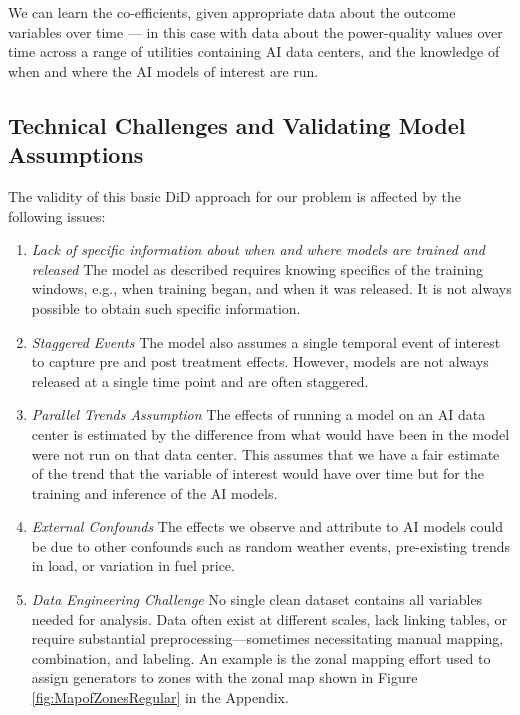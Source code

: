 \documentclass[sigconf,authordraft]{acmart}
\newcommand{\nb}[1]{\textcolor{blue}{NB[#1]}}
\begin{document}
We can learn the co-efficients, given appropriate data about the outcome variables over time --- in this case with data about the power-quality values over time across a range of utilities containing AI data centers, and the knowledge of when and where the AI models of interest are run.



\subsection{Technical Challenges and Validating Model Assumptions}\label{DCASSUmptions}
The validity of this basic DiD approach for our problem is affected by the following issues:
\begin{enumerate}
    \item \textit{Lack of specific information about when and where models are trained and released} The model as described requires knowing specifics of the training windows, e.g., when training began, and when it was released. It is not always possible to obtain such specific information. 
    \item \textit{Staggered Events} The model also assumes a single temporal event of interest to capture pre and post treatment effects. However, models are not always released at a single time point and are often staggered.    
    \item \textit{Parallel Trends Assumption} The effects of running a model on an AI data center is estimated by the difference from what would have been in the model were not run on that data center. This assumes that we have a fair estimate of the trend that the variable of interest would have over time but for the training and inference of the AI models. 
   
    \item \textit{External Confounds} The effects we observe and attribute to AI models could be due to other confounds such as random weather events, pre-existing trends in load, or variation in fuel price.
    \item \textit{Data Engineering Challenge} No single clean dataset contains all variables needed for analysis. Data often exist at different scales, lack linking tables, or require substantial preprocessing—sometimes necessitating manual mapping, combination, and labeling. An example is the zonal mapping effort used to assign generators to zones with the zonal map shown in Figure \ref{fig:MapofZonesRegular} in the Appendix.
\end{enumerate}
    
\end{document}
